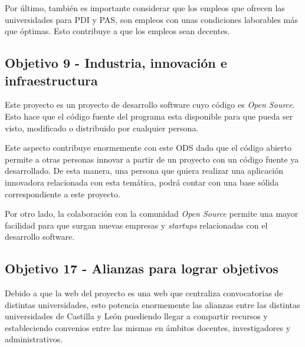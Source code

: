 Por último, también es importante considerar que los empleos que ofrecen las universidades para PDI y PAS, son empleos con unas condiciones laborables más que óptimas. Esto contribuye a que los empleos sean decentes.

\subsection{Objetivo 9 - Industria, innovación e infraestructura}
Este proyecto es un proyecto de desarrollo software cuyo código es \textit{Open Source}. Esto hace que el código fuente del programa esta disponible para que pueda ser visto, modificado o distribuido por cualquier persona.

Este aspecto contribuye enormemente con este ODS dado que el código abierto permite a otras personas innovar a partir de un proyecto con un código fuente ya desarrollado. De esta manera, una persona que quiera realizar una aplicación innovadora relacionada con esta temática, podrá contar con una base sólida correspondiente a este proyecto.

Por otro lado, la colaboración con la comunidad \textit{Open Source} permite una mayor facilidad para que surgan nuevas empresas y \textit{startups} relacionadas con el desarrollo software.


\subsection{Objetivo 17 - Alianzas para lograr objetivos}
Debido a que la web del proyecto es una web que centraliza convocatorias de distintas universidades, esto potencia enormemente las alianzas entre las distintas universidades de Castilla y León puediendo llegar a compartir recursos y estableciendo convenios entre las mismas en ámbitos docentes, investigadores y administrativos.

